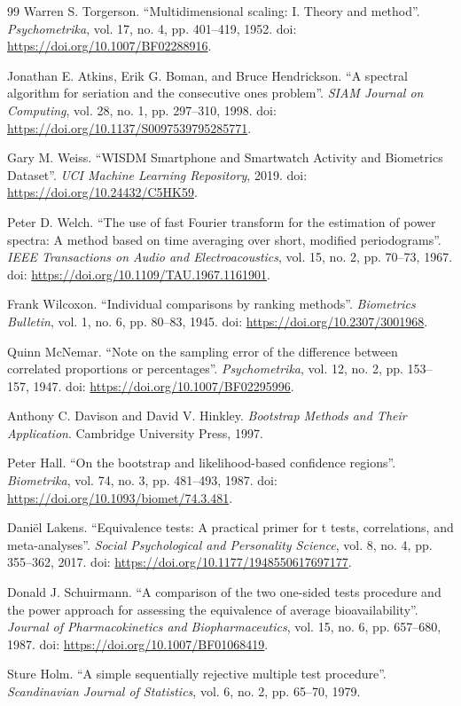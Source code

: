 \documentclass[5p]{elsarticle}
\begin{document}
\begin{thebibliography}{99}
Warren S. Torgerson. ``Multidimensional scaling: I. Theory and method''. \textit{Psychometrika}, vol. 17, no. 4, pp. 401--419, 1952. doi: \url{https://doi.org/10.1007/BF02288916}.

Jonathan E. Atkins, Erik G. Boman, and Bruce Hendrickson. ``A spectral algorithm for seriation and the consecutive ones problem''. \textit{SIAM Journal on Computing}, vol. 28, no. 1, pp. 297--310, 1998. doi: \url{https://doi.org/10.1137/S0097539795285771}.

Gary M. Weiss. ``WISDM Smartphone and Smartwatch Activity and Biometrics Dataset''. \textit{UCI Machine Learning Repository}, 2019. doi: \url{https://doi.org/10.24432/C5HK59}.

Peter D. Welch. ``The use of fast Fourier transform for the estimation of power spectra: A method based on time averaging over short, modified periodograms''. \textit{IEEE Transactions on Audio and Electroacoustics}, vol. 15, no. 2, pp. 70--73, 1967. doi: \url{https://doi.org/10.1109/TAU.1967.1161901}.

Frank Wilcoxon. ``Individual comparisons by ranking methods''. \textit{Biometrics Bulletin}, vol. 1, no. 6, pp. 80--83, 1945. doi: \url{https://doi.org/10.2307/3001968}.

Quinn McNemar. ``Note on the sampling error of the difference between correlated proportions or percentages''. \textit{Psychometrika}, vol. 12, no. 2, pp. 153--157, 1947. doi: \url{https://doi.org/10.1007/BF02295996}.

Anthony C. Davison and David V. Hinkley. \textit{Bootstrap Methods and Their Application}. Cambridge University Press, 1997.

Peter Hall. ``On the bootstrap and likelihood-based confidence regions''. \textit{Biometrika}, vol. 74, no. 3, pp. 481--493, 1987. doi: \url{https://doi.org/10.1093/biomet/74.3.481}.

Daniël Lakens. ``Equivalence tests: A practical primer for t tests, correlations, and meta-analyses''. \textit{Social Psychological and Personality Science}, vol. 8, no. 4, pp. 355--362, 2017. doi: \url{https://doi.org/10.1177/1948550617697177}.

Donald J. Schuirmann. ``A comparison of the two one-sided tests procedure and the power approach for assessing the equivalence of average bioavailability''. \textit{Journal of Pharmacokinetics and Biopharmaceutics}, vol. 15, no. 6, pp. 657--680, 1987. doi: \url{https://doi.org/10.1007/BF01068419}.

Sture Holm. ``A simple sequentially rejective multiple test procedure''. \textit{Scandinavian Journal of Statistics}, vol. 6, no. 2, pp. 65--70, 1979.
\end{thebibliography}
\end{document}
